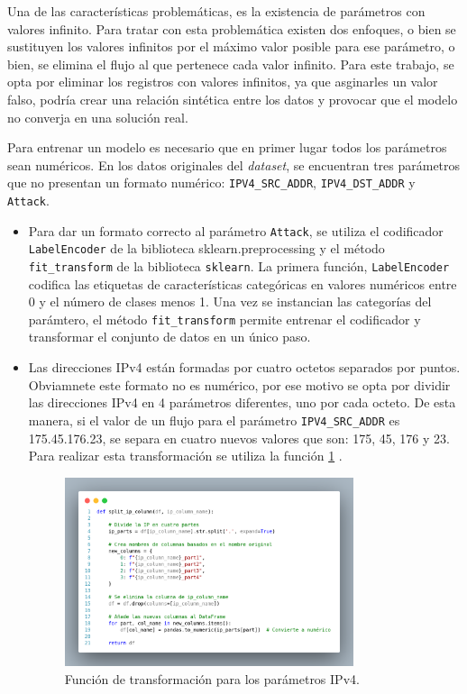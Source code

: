 Una de las características problemáticas, es la existencia de parámetros con valores infinito. Para tratar con esta problemática existen dos enfoques, o bien se sustituyen los valores infinitos por el máximo valor posible para ese parámetro, o bien, se elimina el flujo al que pertenece cada valor infinito. Para este trabajo, se opta por eliminar los registros con valores infinitos, ya que asginarles un valor falso, podría crear una relación sintética entre los datos y provocar que el modelo no converja en una solución real.

Para entrenar un modelo es necesario que en primer lugar todos los parámetros sean numéricos. En los datos originales del \textit{dataset}, se encuentran tres parámetros que no presentan un formato numérico: \texttt{IPV4\_SRC\_ADDR}, \texttt{IPV4\_DST\_ADDR} y \texttt{Attack}.

\begin{itemize}
	\item Para dar un formato correcto al parámetro \texttt{Attack}, se utiliza el codificador \texttt{LabelEncoder} de la biblioteca sklearn.preprocessing y el método \texttt{fit\_transform} de la biblioteca \texttt{sklearn}. La primera función, \texttt{LabelEncoder} codifica las etiquetas de características categóricas en valores numéricos entre 0 y el número de clases menos 1. Una vez se instancian las categorías del parámtero, el método \texttt{fit\_transform} permite entrenar el codificador y transformar el conjunto de datos en un único paso.
	\item Las direcciones IPv4 están formadas por cuatro octetos separados por puntos. Obviamnete este formato no es numérico, por ese motivo se opta por dividir las direcciones IPv4 en 4 parámetros diferentes, uno por cada octeto. De esta manera, si el valor de un flujo para el parámetro \texttt{IPV4\_SRC\_ADDR} es 175.45.176.23, se separa en cuatro nuevos valores que son: 175, 45, 176 y 23. Para realizar esta transformación se utiliza la función \ref{fig:funIPv4} .
\begin{figure}[H]
    \centering
    \includegraphics[width=0.8\textwidth]{./img/ent-datos/funIPv4.png}
    \caption{Función de transformación para los parámetros IPv4.}
    \label{fig:funIPv4}
\end{figure}

\end{itemize}

